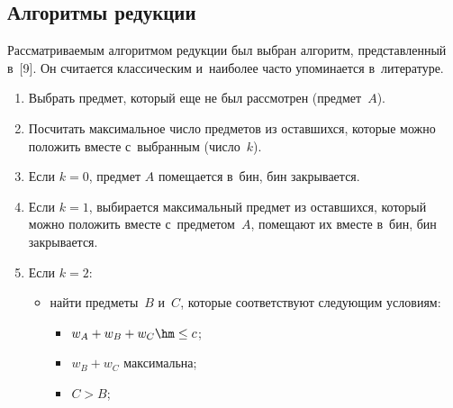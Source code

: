 \subsection{Алгоритмы редукции}



Рассматриваемым алгоритмом редукции был выбран алгоритм, пред\-став\-лен\-ный в~[9]. Он считается классическим и~наиболее час\-то упоминается в~ли\-те\-ра\-туре.





\noindent

\begin{enumerate}[1.]

    \item Выбрать предмет, который еще не был рассмотрен (пред\-мет~$A$).

    \item Посчитать максимальное число предметов из оставшихся, которые мож\-но положить вместе с~выбранным (чис\-ло~$k$).

    \item Если $k=0$,  предмет $A$ помещается в~бин, бин за\-кры\-ва\-ется.

    \item Если $k=1$,  выбирается максимальный предмет из остав\-ших\-ся, который мож\-но положить вмес\-те с~предметом~$A$, помещают их вмес\-те в~бин, бин за\-кры\-ва\-ется.

    \item Если $k=2$:

    \begin{itemize}

        \item[(a)] найти предметы~$B$ и~$C$, которые соответствуют сле\-ду\-ющим усло\-виям:

        \begin{itemize}

            \item[(i)] $w_A + w_B + w_C \hm\leq c$;

            \item[(ii)] $w_B + w_C$ максимальна;


            \item[iii)] $C > B$;

        \end{itemize}


\end{itemize}
\end{enumerate}
